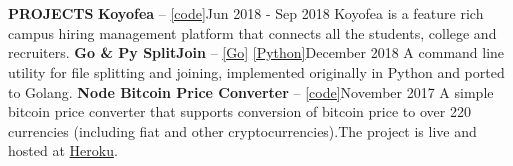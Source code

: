 \documentclass[a4paper, 12pt]{article}
\begin{document}
\vspace{-2.2cm}

\section*{}
\begin{vwcol}[widths={0.2, 0.8}, justify=flush, sep=0.7cm, rule=0pt, indent=1em]
\large{\textbf{\textcolor{uclagold}{PROJECTS}}}\newline\newline\newline\newline\newline\newline\newline\newline\newline\newline\newline\newline\newline\newline\newline\newline
\large{\textbf{Koyofea} -- \textcolor{frenchblue}{\href{https://github.com/ImRaviTejaG/koyofea-back}{[code]}}}\hspace{8.4cm}\tiny{Jun 2018 - Sep 2018}\vspace{-0.05cm}\newline
\small{Koyofea is a feature rich campus hiring management platform that connects all the students, college and recruiters.}\vspace{0.3cm}\newline
\large{\textbf{Go \& Py SplitJoin} -- \textcolor{frenchblue}{\href{https://github.com/ImRaviTejaG/go-split-join}{[Go]} \href{https://github.com/ImRaviTejaG/pysj}{[Python]}}}\hspace{4.6cm}\tiny{December 2018}\vspace{-0.05cm}\newline
\small{A command line utility for file splitting and joining, implemented originally in Python and ported to Golang.}\vspace{0.3cm}\newline
\large{\textbf{Node Bitcoin Price Converter} -- \textcolor{frenchblue}{\href{https://github.com/ImRaviTejaG/Node-Bitcoin-Price-Converter}{[code]}}}\hspace{3.5cm}\tiny{November 2017}\vspace{-0.05cm}\newline
\small{A simple bitcoin price converter that supports conversion of bitcoin price to over 220 currencies (including fiat and other cryptocurrencies).The project is live and hosted at \textcolor{frenchblue}{\href{https://btc-price-converter.herokuapp.com}{Heroku}}.}\vspace{0.3cm}\newline
\end{vwcol}
\end{document}
